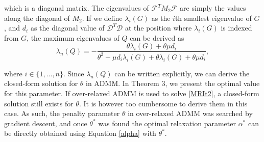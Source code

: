 \documentclass[letterpaper]{article} %
\begin{document}
\noindent which is a diagonal matrix. The eigenvalues of $\mathcal{F}^T M_2 \mathcal{F}$ are simply the values along the diagonal of $M_2$. If we define $\lambda_i(G)$ as the $i$th smallest eigenvalue of $G$, and $d_i$ as the diagonal value of $\mathcal{D}^T \mathcal{D}$ at the position where $\lambda_i(G)$ is indexed from $G$, the maximum eigenvalues of $Q$ can be derived as 
\begin{equation*}
	\lambda_n(Q) = -\frac{\theta \lambda_i(G)+\theta\mu d_i}{\theta^2+\mu d_i \lambda_i(G)+\theta \lambda_i(G)+\theta\mu d_i},
\end{equation*}

where $i \in \{1,...,n\}$. Since $\lambda_n (Q)$ can be written explicitly, we can derive the closed-form solution for $\theta$ in ADMM. In Theorem 3, we present the optimal value for this parameter. If over-relaxed ADMM is used to solve \eqref{MRIt2}, a closed-form solution still exists for $\theta$. It is however too cumbersome to derive them in this case. As such, the penalty parameter $\theta$ in over-relaxed ADMM was searched by gradient descent, and once $\theta^*$ was found the optimal relaxation parameter $\alpha^*$ can be directly obtained using Equation \eqref{alpha} with $\theta^*$.
\end{document}
